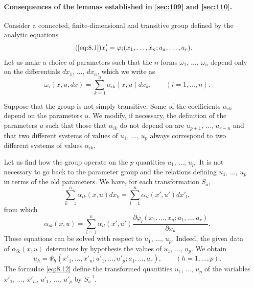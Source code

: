 \documentclass[leqno,11pt]{book}
\makeatletter
\numberwithin{equation}{chapter}
\newcommand{\pd}{\partial}
\theoremstyle{shape1}
\theoremstyle{shapesmall}
\let\old@phi\phi
\let\old@varphi\varphi
\let\phi\old@varphi
\let\varphi\old@phi
\newcommand{\fsref}[1]{{\rm\textsection\textbf{\ref{sec:#1}}}}
\newcommand{\somespace}{\vspace{9pt}}
\makeatother
\begin{document}
\paragraph{Consequences of the lemmas established in \fsref{109} and \fsref{110}.}
\label{sec:112}
Consider a connected, finite-dimensional and transitive group defined by the analytic equations
\begin{equation}
  \label{eq:8.1--}\tag{\ref{eq:8.1}}
  x'_{i}=\phi_{i}(x_{1},\dots,x_{n};a_{a},\dots,a_{r}).
\end{equation}
Let us make a choice of parameters such that the $n$ forms $\omega_{1}$, $\dots$, $\omega_{n}$ depend only on the differentials $dx_{1}$, $\dots$, $dx_{n}$, which we write as
\[
\omega_{i}(x,u,dx)=\sum_{k=1}^{n}\alpha_{ik}(x,u)dx_{k},\qquad(i=1,\dots,n).
\]

Suppose that the group is not simply transitive. Some of the coefficients $\alpha_{ik}$ depend on the parameters $u$. We modify, if necessary, the definition of the parameters $u$ such that those that $\alpha_{ik}$ do not depend on are $u_{p+1}$, $\dots$, $u_{r-n}$ and that two different systems of values of $u_{1}$, $\dots$, $u_{p}$ always correspond to two different systems of values $\alpha_{ik}$.

Let us find how the group operate on the $p$ quantities $u_{1}$, $\dots$, $u_{p}$. It is not necessary to go back to the parameter group and the relations defining $u_{1}$, $\dots$, $u_{p}$ in terms of the old parameters. We have, for each transformation $S_{a}$,
\[
\sum_{k=1}^{n}\alpha_{ik}(x,u)dx_{k}=\sum_{l=1}^{n}\alpha_{il}(x',u')dx'_{l},
\]
from which
\[
\alpha_{ik}(x,u)=\sum_{l=1}^{n}\alpha_{il}(x',u')\frac{\pd \phi_{l}(x_{1},\dots,x_{n};a_{1},\dots,a_{r})}{\pd x_{k}}.
\]
These equations can be solved with respect to $u_{1}$, $\dots$, $u_{p}$. Indeed, the given data of $\alpha_{ik}(x,u)$ determines by hypothesis the values of $u_{1}$, $\dots$, $u_{p}$. We obtain
\begin{equation}
  \label{eq:8.12}
  u_{h}=\Psi_{h}(x'_{1},\dots,x'_{n};u'_{1},\dots,u'_{p};a_{1},\dots,a_{r}),\qquad(h=1,\dots,p).
\end{equation}
The formulae \eqref{eq:8.12} define the transformed quantities $u_{1}$, $\dots$, $u_{p}$ of the variables $x'_{1}$, $\dots$, $x'_{n}$, $u'_{1}$, $\dots$, $u'_{p}$ by $S^{-1}_{a}$.

\somespace
\end{document}
